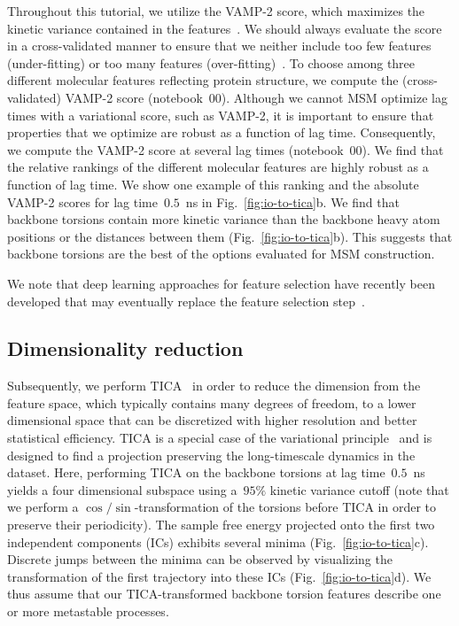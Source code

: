 \documentclass[9pt,tutorial]{livecoms}
\begin{document}
Throughout this tutorial, we utilize the VAMP-2 score, which maximizes the kinetic variance contained in the features~\cite{kinetic-maps}.
We should always evaluate the score in a cross-validated manner to ensure that we neither include too few features (under-fitting) or too many features (over-fitting)~\cite{gmrq,vamp-preprint}.
To choose among three different molecular features reflecting protein structure,
we compute the (cross-validated) VAMP-2 score (notebook~00).
Although we cannot MSM optimize lag times with a variational score\cite{husic2017note}, such as VAMP-2,
it is important to ensure that properties that we optimize are robust as a function of lag time. 
Consequently, we compute the VAMP-2 score at several lag times (notebook~00). 
We find that the relative rankings of the different molecular features are highly robust as a function of lag time. 
We show one example of this ranking and the absolute VAMP-2 scores for lag time~$0.5$~ns in Fig.~\ref{fig:io-to-tica}b. 
We find that backbone torsions contain more kinetic variance than the backbone heavy atom positions or the distances between them (Fig.~\ref{fig:io-to-tica}b).
This suggests that backbone torsions are the best of the options evaluated for MSM construction.

We note that deep learning approaches for feature selection have recently been developed that may eventually replace the feature selection step~\cite{vampnet,tae,hernandez-vde}.

\subsection{Dimensionality reduction}

Subsequently, we perform TICA~\cite{tica,kinetic-maps} in order to reduce the dimension from the feature space,
which typically contains many degrees of freedom,
to a lower dimensional space that can be discretized with higher resolution and better statistical efficiency.
TICA is a special case of the variational principle~\cite{noe-vac,nueske-vamk} and is designed to find a projection preserving the long-timescale dynamics in the dataset.
Here, performing TICA on the backbone torsions at lag time~$0.5$~ns yields a four dimensional subspace using a~$95\%$ kinetic variance cutoff
(note that we perform a $\cos/\sin$-transformation of the torsions before TICA in order to preserve their periodicity).
The sample free energy projected onto the first two independent components (ICs) exhibits several minima (Fig.~\ref{fig:io-to-tica}c).
Discrete jumps between the minima can be observed by visualizing the transformation of the first trajectory into these ICs (Fig.~\ref{fig:io-to-tica}d).
We thus assume that our TICA-transformed backbone torsion features describe one or more metastable processes.
\end{document}

